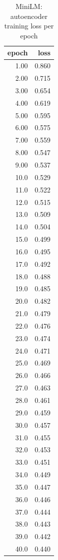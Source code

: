 \begin{table}[ht]
\centering
\caption{MiniLM: autoencoder training loss per epoch}
\label{tab:minilm_ae_training_losses}
\begin{tabular}{rr}
\toprule
epoch & loss \\
\midrule
1.00 & 0.860 \\
2.00 & 0.715 \\
3.00 & 0.654 \\
4.00 & 0.619 \\
5.00 & 0.595 \\
6.00 & 0.575 \\
7.00 & 0.559 \\
8.00 & 0.547 \\
9.00 & 0.537 \\
10.0 & 0.529 \\
11.0 & 0.522 \\
12.0 & 0.515 \\
13.0 & 0.509 \\
14.0 & 0.504 \\
15.0 & 0.499 \\
16.0 & 0.495 \\
17.0 & 0.492 \\
18.0 & 0.488 \\
19.0 & 0.485 \\
20.0 & 0.482 \\
21.0 & 0.479 \\
22.0 & 0.476 \\
23.0 & 0.474 \\
24.0 & 0.471 \\
25.0 & 0.469 \\
26.0 & 0.466 \\
27.0 & 0.463 \\
28.0 & 0.461 \\
29.0 & 0.459 \\
30.0 & 0.457 \\
31.0 & 0.455 \\
32.0 & 0.453 \\
33.0 & 0.451 \\
34.0 & 0.449 \\
35.0 & 0.447 \\
36.0 & 0.446 \\
37.0 & 0.444 \\
38.0 & 0.443 \\
39.0 & 0.442 \\
40.0 & 0.440 \\
\bottomrule
\end{tabular}
\end{table}
